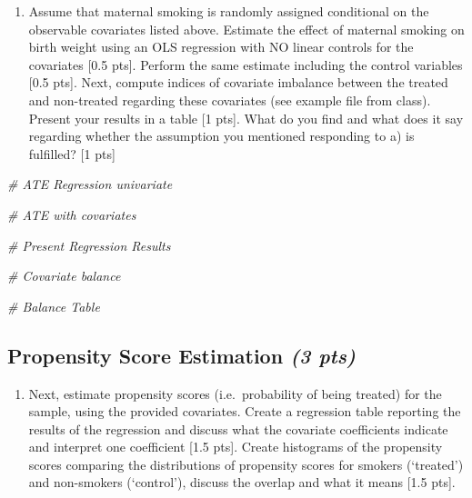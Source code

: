 \documentclass[
]{article}
\newenvironment{Shaded}{\begin{snugshade}}{\end{snugshade}}
\newcommand{\CommentTok}[1]{\textcolor[rgb]{0.56,0.35,0.01}{\textit{#1}}}
\providecommand{\tightlist}{%
  \setlength{\itemsep}{0pt}\setlength{\parskip}{0pt}}
\begin{document}
\begin{enumerate}
\def\labelenumi{\alph{enumi})}
\setcounter{enumi}{1}
\tightlist
\item
  Assume that maternal smoking is randomly assigned conditional on the
  observable covariates listed above. Estimate the effect of maternal
  smoking on birth weight using an OLS regression with NO linear
  controls for the covariates {[}0.5 pts{]}. Perform the same estimate
  including the control variables {[}0.5 pts{]}. Next, compute indices
  of covariate imbalance between the treated and non-treated regarding
  these covariates (see example file from class). Present your results
  in a table {[}1 pts{]}. What do you find and what does it say
  regarding whether the assumption you mentioned responding to a) is
  fulfilled? {[}1 pts{]}
\end{enumerate}

\begin{Shaded}
\begin{Highlighting}[]
\CommentTok{\# ATE Regression univariate}


\CommentTok{\# ATE with covariates}


\CommentTok{\# Present Regression Results}


\CommentTok{\# Covariate balance}


\CommentTok{\# Balance Table }
\end{Highlighting}
\end{Shaded}

\hypertarget{propensity-score-estimation-3-pts}{%
\subsection{\texorpdfstring{Propensity Score Estimation \emph{(3
pts)}}{Propensity Score Estimation (3 pts)}}\label{propensity-score-estimation-3-pts}}

\begin{enumerate}
\def\labelenumi{\alph{enumi})}
\setcounter{enumi}{2}
\tightlist
\item
  Next, estimate propensity scores (i.e.~probability of being treated)
  for the sample, using the provided covariates. Create a regression
  table reporting the results of the regression and discuss what the
  covariate coefficients indicate and interpret one coefficient {[}1.5
  pts{]}. Create histograms of the propensity scores comparing the
  distributions of propensity scores for smokers (`treated') and
  non-smokers (`control'), discuss the overlap and what it means {[}1.5
  pts{]}.
\end{enumerate}
\end{document}
